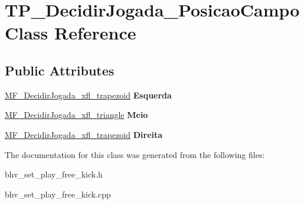 \hypertarget{classTP__DecidirJogada__PosicaoCampo}{
\section{TP\_\-DecidirJogada\_\-PosicaoCampo Class Reference}
\label{classTP__DecidirJogada__PosicaoCampo}
}
\subsection*{Public Attributes}
\begin{DoxyCompactItemize}
\item 
\hypertarget{classTP__DecidirJogada__PosicaoCampo_ab3cfed94c84662a6c79a2c550f7d2015}{
\hyperlink{classMF__DecidirJogada__xfl__trapezoid}{MF\_\-DecidirJogada\_\-xfl\_\-trapezoid} {\bfseries Esquerda}}
\label{classTP__DecidirJogada__PosicaoCampo_ab3cfed94c84662a6c79a2c550f7d2015}

\item 
\hypertarget{classTP__DecidirJogada__PosicaoCampo_a00f9a6782d601487deba77ce086f7f77}{
\hyperlink{classMF__DecidirJogada__xfl__triangle}{MF\_\-DecidirJogada\_\-xfl\_\-triangle} {\bfseries Meio}}
\label{classTP__DecidirJogada__PosicaoCampo_a00f9a6782d601487deba77ce086f7f77}

\item 
\hypertarget{classTP__DecidirJogada__PosicaoCampo_acd33332fede5bf769884e2d8689bc99a}{
\hyperlink{classMF__DecidirJogada__xfl__trapezoid}{MF\_\-DecidirJogada\_\-xfl\_\-trapezoid} {\bfseries Direita}}
\label{classTP__DecidirJogada__PosicaoCampo_acd33332fede5bf769884e2d8689bc99a}

\end{DoxyCompactItemize}


The documentation for this class was generated from the following files:\begin{DoxyCompactItemize}
\item 
bhv\_\-set\_\-play\_\-free\_\-kick.h\item 
bhv\_\-set\_\-play\_\-free\_\-kick.cpp\end{DoxyCompactItemize}

